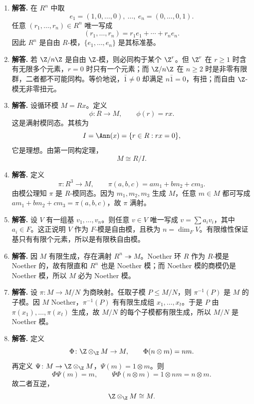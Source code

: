 \begin{enumerate}[label=\textbf{\arabic*.}, leftmargin=*, itemsep=1em]
  \item \textbf{解答.} 在 $R^n$ 中取
  \[
  e_1=(1,0,\dots,0),\ \dots,\ e_n=(0,\dots,0,1).
  \]
  任意 $(r_1,\dots,r_n)\in R^n$ 唯一写成
  \[
  (r_1,\dots,r_n)=r_1e_1+\cdots+r_ne_n.
  \]
  因此 $R^n$ 是自由 $R$-模，$\{e_1,\dots,e_n\}$ 是其标准基。

  \item \textbf{解答.} 若 $\Z/n\Z$ 是自由 $\Z$-模，则必同构于某个 $\Z^r$。但 $\Z^r$ 在 $r\ge 1$ 时含有无限多个元素，$r=0$ 时只有一个元素；而 $\Z/n\Z$ 在 $n\ge 2$ 时是非零有限群，二者都不可能同构。等价地说，$\bar 1\neq 0$ 却满足 $n\bar 1=0$，有扭；而自由 $\Z$-模无非零扭元。

  \item \textbf{解答.} 设循环模 $M=Rx$。定义
  \[
  \phi\colon R\to M,\qquad \phi(r)=rx.
  \]
  这是满射模同态。其核为
  \[
  I=\Ann(x)=\{r\in R:rx=0\},
  \]
  它是理想。由第一同构定理，
  \[
  M\cong R/I.
  \]

  \item \textbf{解答.} 定义
  \[
  \pi\colon R^3\to M,\qquad \pi(a,b,c)=am_1+bm_2+cm_3.
  \]
  由模公理知 $\pi$ 是 $R$-模同态。因为 $m_1,m_2,m_3$ 生成 $M$，任意 $m\in M$ 都可写成 $am_1+bm_2+cm_3=\pi(a,b,c)$，故 $\pi$ 满射。

  \item \textbf{解答.} 设 $V$ 有一组基 $v_1,\dots,v_n$。则任意 $v\in V$ 唯一写成 $v=\sum a_iv_i$，其中 $a_i\in F$。这正说明 $V$ 作为 $F$-模是自由模，且秩为 $n=\dim_FV$。有限维性保证基只有有限个元素，所以是有限秩自由模。

  \item \textbf{解答.} 因 $M$ 有限生成，存在满射 $R^n\twoheadrightarrow M$。Noether 环 $R$ 作为 $R$-模是 Noether 的，故有限直和 $R^n$ 也是 Noether 模；而 Noether 模的商模仍是 Noether 模，所以 $M$ 必为 Noether 模。

  \item \textbf{解答.} 设 $\pi\colon M\to M/N$ 为商映射。任取子模 $P\le M/N$，则 $\pi^{-1}(P)$ 是 $M$ 的子模。因 $M$ Noether，$\pi^{-1}(P)$ 有有限生成组 $x_1,\dots,x_t$。于是 $P$ 由 $\pi(x_1),\dots,\pi(x_t)$ 生成，故 $M/N$ 的每个子模都有限生成，所以 $M/N$ 是 Noether 模。

  \item \textbf{解答.} 定义
  \[
  \Phi\colon \Z\otimes_\Z M\to M,\qquad \Phi(n\otimes m)=nm.
  \]
  再定义 $\Psi\colon M\to \Z\otimes_\Z M$，$\Psi(m)=1\otimes m$。则
  \[
  \Phi\Psi(m)=m,
  \qquad
  \Psi\Phi(n\otimes m)=1\otimes nm=n\otimes m.
  \]
  故二者互逆，
  \[
  \Z\otimes_\Z M\cong M.
  \]


\end{enumerate}
